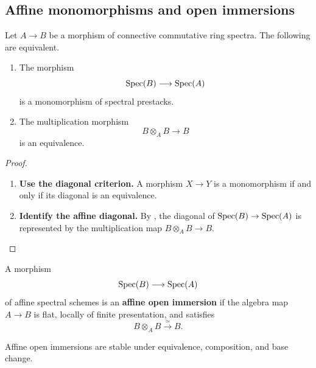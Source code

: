 \subsection{Affine monomorphisms and open immersions}

\begin{proposition}
\label{prop:affine-monomorphism-criterion}
Let $A\to B$ be a morphism of connective commutative ring spectra. The
following are equivalent.
\begin{enumerate}[label=(\roman*)]
    \item The morphism
    \[
        \operatorname{Spec}(B)
        \longrightarrow
        \operatorname{Spec}(A)
    \]
    is a monomorphism of spectral prestacks.

    \item The multiplication morphism
    \[
        B\otimes_A B
        \longrightarrow
        B
    \]
    is an equivalence.
\end{enumerate}
\end{proposition}

\begin{proof}
\leavevmode
\begin{enumerate}[label=\textup{(\arabic*)}]
    \item \textbf{Use the diagonal criterion.}
    A morphism $X\to Y$ is a monomorphism if and only if its diagonal is an
    equivalence.

    \item \textbf{Identify the affine diagonal.}
    By , the diagonal of
    $\operatorname{Spec}(B)\to\operatorname{Spec}(A)$ is represented by the multiplication map
    $B\otimes_A B\to B$.
\end{enumerate}
\end{proof}

\begin{definition}
\label{def:affine-open-immersion-spectral}
A morphism
\[
    \operatorname{Spec}(B)
    \longrightarrow
    \operatorname{Spec}(A)
\]
of affine spectral schemes is an \textbf{affine open immersion} if the
algebra map $A\to B$ is flat, locally of finite presentation, and satisfies
\[
    B\otimes_A B
    \xrightarrow{\simeq}
    B.
\]
\end{definition}

\begin{proposition}
\label{prop:affine-open-permanence}
Affine open immersions are stable under equivalence, composition, and base
change.
\end{proposition}

